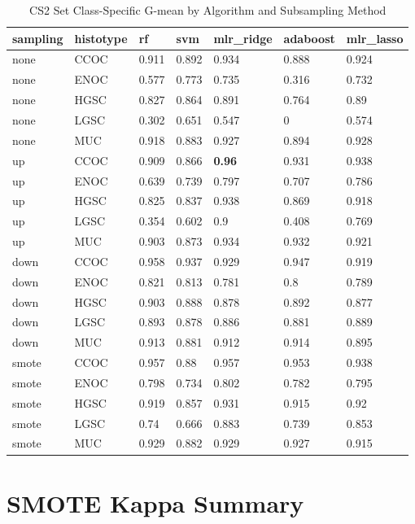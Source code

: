 \documentclass[
]{report}
\begin{document}
\begin{table}

\caption{\label{tab:cs2-gmean-class-table}CS2 Set Class-Specific G-mean by Algorithm and Subsampling Method}
\centering
\begin{tabular}[t]{l|l|l|l|l|l|l}
\hline
sampling & histotype & rf & svm & mlr\_ridge & adaboost & mlr\_lasso\\
\hline
none & CCOC & 0.911 & 0.892 & 0.934 & 0.888 & 0.924\\
\hline
none & ENOC & 0.577 & 0.773 & 0.735 & 0.316 & 0.732\\
\hline
none & HGSC & 0.827 & 0.864 & 0.891 & 0.764 & 0.89\\
\hline
none & LGSC & 0.302 & 0.651 & 0.547 & 0 & 0.574\\
\hline
none & MUC & 0.918 & 0.883 & 0.927 & 0.894 & 0.928\\
\hline
up & CCOC & 0.909 & 0.866 & \textbf{0.96} & 0.931 & 0.938\\
\hline
up & ENOC & 0.639 & 0.739 & 0.797 & 0.707 & 0.786\\
\hline
up & HGSC & 0.825 & 0.837 & 0.938 & 0.869 & 0.918\\
\hline
up & LGSC & 0.354 & 0.602 & 0.9 & 0.408 & 0.769\\
\hline
up & MUC & 0.903 & 0.873 & 0.934 & 0.932 & 0.921\\
\hline
down & CCOC & 0.958 & 0.937 & 0.929 & 0.947 & 0.919\\
\hline
down & ENOC & 0.821 & 0.813 & 0.781 & 0.8 & 0.789\\
\hline
down & HGSC & 0.903 & 0.888 & 0.878 & 0.892 & 0.877\\
\hline
down & LGSC & 0.893 & 0.878 & 0.886 & 0.881 & 0.889\\
\hline
down & MUC & 0.913 & 0.881 & 0.912 & 0.914 & 0.895\\
\hline
smote & CCOC & 0.957 & 0.88 & 0.957 & 0.953 & 0.938\\
\hline
smote & ENOC & 0.798 & 0.734 & 0.802 & 0.782 & 0.795\\
\hline
smote & HGSC & 0.919 & 0.857 & 0.931 & 0.915 & 0.92\\
\hline
smote & LGSC & 0.74 & 0.666 & 0.883 & 0.739 & 0.853\\
\hline
smote & MUC & 0.929 & 0.882 & 0.929 & 0.927 & 0.915\\
\hline
\end{tabular}
\end{table}

\hypertarget{smote-kappa-summary}{%
\section{SMOTE Kappa Summary}\label{smote-kappa-summary}}
\end{document}
